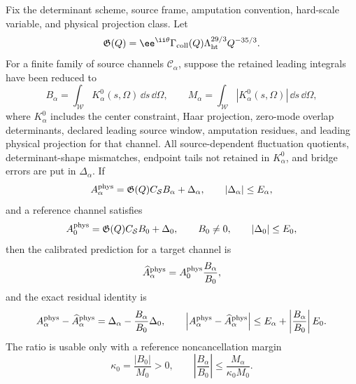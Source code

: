 \begin{controlledapproximation}
\label{ca:instanton-hard-reference-channel-calibration}
Fix the determinant scheme, source frame, amputation convention, hard-scale
variable, and physical projection class.  Let
\[
  \mathfrak G(Q)
  =
  \ee^{\ii\theta}
  \Gamma_{\rm coll}(Q)\Lambda_{\rm ht}^{29/3}Q^{-35/3}.
\]
For a finite family of source channels \(\mathcal C_\alpha\), suppose the
retained leading integrals have been reduced to
\begin{equation}
  B_\alpha
  =
  \int_{\mathcal W}
  K_\alpha^{0}(s,\Omega)\,\dd s\,\dd\Omega,
  \qquad
  M_\alpha
  =
  \int_{\mathcal W}
  |K_\alpha^{0}(s,\Omega)|\,\dd s\,\dd\Omega,
  \label{eq:instanton-hard-reference-channel-integrals}
\end{equation}
where \(K_\alpha^{0}\) includes the center constraint, Haar projection,
zero-mode overlap determinants, declared leading source window, amputation
residues, and leading physical projection for that channel.  All
source-dependent fluctuation quotients, determinant-shape mismatches,
endpoint tails not retained in \(K_\alpha^{0}\), and bridge errors are put in
\(\Delta_\alpha\).  If
\begin{equation}
  A_\alpha^{\rm phys}
  =
  \mathfrak G(Q) C_{\mathcal S}B_\alpha+\Delta_\alpha,
  \qquad
  |\Delta_\alpha|\le E_\alpha,
  \label{eq:instanton-hard-reference-family}
\end{equation}
and a reference channel satisfies
\begin{equation}
  A_0^{\rm phys}
  =
  \mathfrak G(Q) C_{\mathcal S}B_0+\Delta_0,
  \qquad
  B_0\ne0,\qquad |\Delta_0|\le E_0,
  \label{eq:instanton-hard-reference-input}
\end{equation}
then the calibrated prediction for a target channel is
\begin{equation}
  \widehat A_\alpha^{\rm phys}
  =
  A_0^{\rm phys}\frac{B_\alpha}{B_0},
  \label{eq:instanton-hard-reference-prediction}
\end{equation}
and the exact residual identity is
\begin{equation}
  A_\alpha^{\rm phys}-\widehat A_\alpha^{\rm phys}
  =
  \Delta_\alpha-\frac{B_\alpha}{B_0}\Delta_0,
  \qquad
  \left|
  A_\alpha^{\rm phys}-\widehat A_\alpha^{\rm phys}
  \right|
  \le
  E_\alpha+\left|\frac{B_\alpha}{B_0}\right|E_0 .
  \label{eq:instanton-hard-reference-error}
\end{equation}
The ratio is usable only with a reference noncancellation margin
\begin{equation}
  \kappa_0=\frac{|B_0|}{M_0}>0,
  \qquad
  \left|\frac{B_\alpha}{B_0}\right|
  \le
  \frac{M_\alpha}{\kappa_0M_0}.
  \label{eq:instanton-hard-reference-margin}
\end{equation}


\end{controlledapproximation}
